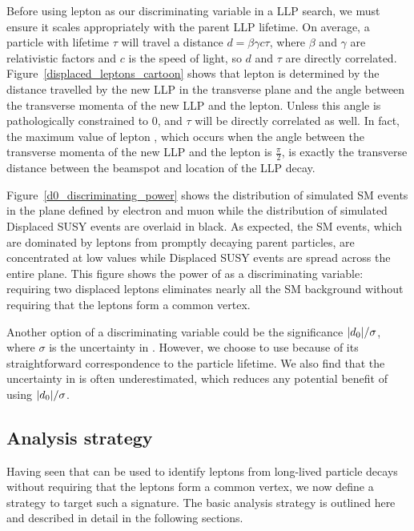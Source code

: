 Before using lepton \ad as our discriminating variable in a LLP search, we must ensure it scales appropriately with the parent LLP lifetime. On average, a particle with lifetime $\tau$ will travel a distance $d=\beta\gamma c \tau$, where $\beta$ and $\gamma$ are relativistic factors and $c$ is the speed of light, so $d$ and $\tau$ are directly correlated. Figure~\ref{displaced_leptons_cartoon} shows that lepton \ad is determined by the distance travelled by the new LLP in the transverse plane and the angle between the transverse momenta of the new LLP and the lepton. Unless this angle is pathologically constrained to \num{0}, \ad and $\tau$ will be directly correlated as well. In fact, the maximum value of lepton \ad, which occurs when the angle between the transverse momenta of the new LLP and the lepton is $\frac{\pi}{2}$, is exactly the transverse distance between the beamspot and location of the LLP decay.

Figure~\ref{d0_discriminating_power} shows the distribution of simulated SM events in the plane defined by electron and muon \ad while the distribution of simulated Displaced SUSY events are overlaid in black. As expected, the SM events, which are dominated by leptons from promptly decaying parent particles, are concentrated at low \ad values while Displaced SUSY events are spread across the entire plane. This figure shows the power of \ad as a discriminating variable: requiring two displaced leptons eliminates nearly all the SM background without requiring that the leptons form a common vertex.

Another option of a discriminating variable could be the \ad significance $\lvert d_0 \rvert/\sigma$, where $\sigma$ is the uncertainty in \ad. However, we choose to use \ad because of its straightforward correspondence to the particle lifetime. We also find that the uncertainty in \ad is often underestimated, which reduces any potential benefit of using $\lvert d_0 \rvert/\sigma$.



\subsection{Analysis strategy}
Having seen that \ad can be used to identify leptons from long-lived particle decays without requiring that the leptons form a common vertex, we now define a strategy to target such a signature. The basic analysis strategy is outlined here and described in detail in the following sections.

